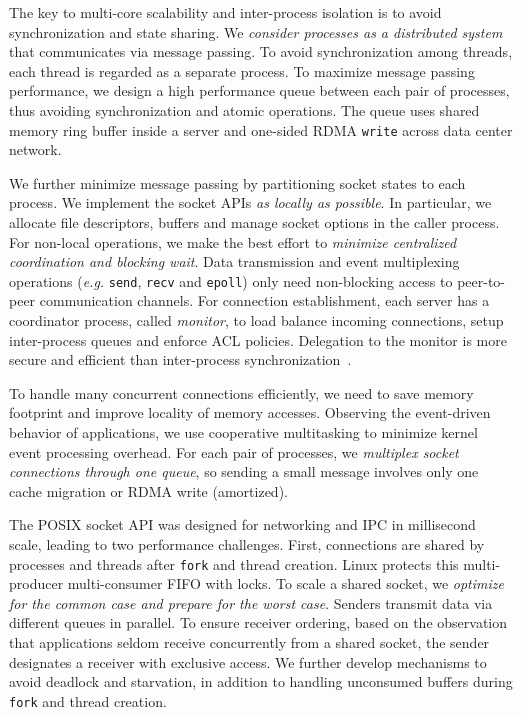 The key to multi-core scalability and inter-process isolation is to avoid synchronization and state sharing. We \textit{consider processes as a distributed system} that communicates via message passing. To avoid synchronization among threads, each thread is regarded as a separate process. To maximize message passing performance, we design a high performance queue between each pair of processes, thus avoiding synchronization and atomic operations. The queue uses shared memory ring buffer inside a server and one-sided RDMA \texttt{write} across data center network.

We further minimize message passing by partitioning socket states to each process. We implement the socket APIs \textit{as locally as possible}. In particular, we allocate file descriptors, buffers and manage socket options in the caller process. For non-local operations, we make the best effort to \textit{minimize centralized coordination and blocking wait}. Data transmission and event multiplexing operations (\textit{e.g.} \texttt{send}, \texttt{recv} and \texttt{epoll}) only need non-blocking access to peer-to-peer communication channels. For connection establishment, each server has a coordinator process, called \textit{monitor}, to load balance incoming connections, setup inter-process queues and enforce ACL policies. Delegation to the monitor is more secure and efficient than inter-process synchronization~\cite{roghanchi2017ffwd}.

To handle many concurrent connections efficiently, we need to save memory footprint and improve locality of memory accesses. Observing the event-driven behavior of applications, we use cooperative multitasking to minimize kernel event processing overhead. For each pair of processes, we \textit{multiplex socket connections through one queue}, so sending a small message involves only one cache migration or RDMA write (amortized).

The POSIX socket API was designed for networking and IPC in millisecond scale, leading to two performance challenges. First, connections are shared by processes and threads after \texttt{fork} and thread creation. Linux protects this multi-producer multi-consumer FIFO with locks. To scale a shared socket, we \textit{optimize for the common case and prepare for the worst case}. Senders transmit data via different queues in parallel. To ensure receiver ordering, based on the observation that applications seldom receive concurrently from a shared socket, the sender designates a receiver with exclusive access. We further develop mechanisms to avoid deadlock and starvation, in addition to handling unconsumed buffers during \texttt{fork} and thread creation.


